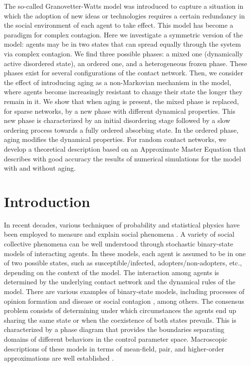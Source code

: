 
The so-called Granovetter-Watts model was introduced to capture a situation in which the adoption of new ideas or technologies requires a certain redundancy in the social environment of each agent to take effect. This model has become a paradigm for complex contagion. Here we investigate a symmetric version of the model: agents may be in two states that can spread equally through the system via complex contagion. We find three possible phases: a mixed one (dynamically active disordered state), an ordered one, and a heterogeneous frozen phase. These phases exist for several configurations of the contact network. Then, we consider the effect of introducing aging as a non-Markovian mechanism in the model, where agents become increasingly resistant to change their state the longer they remain in it.  We show that when aging is present, the mixed phase is replaced, for sparse networks, by a new phase with different dynamical properties. This new phase is characterized by an initial disordering stage followed by a slow ordering process towards a fully ordered absorbing state. In the ordered phase, aging modifies the dynamical properties. For random contact networks, we develop a theoretical description based on an Approximate Master Equation that describes with good accuracy the results of numerical simulations for the model with and without aging.
	
\section{\label{sec:Introduction} Introduction}
	
In recent decades, various techniques of probability and statistical physics have been employed to measure and explain social phenomena \cite{castellano2009statistical,jusup2022social,bianconi2023complex}. A variety of social collective phenomena can be well understood through stochastic binary-state models of interacting agents. In these models, each agent is assumed to be in one of two possible states, such as susceptible/infected, adopters/non-adopters, etc., depending on the context of the model. The interaction among agents is determined by the underlying contact network and the dynamical rules of the model. There are various examples of binary-state models, including processes of opinion formation \cite{Voter-original, sood-2005, Suchecki-2005, fernandez-gracia-2014, redner-2019} and disease or social contagion \cite{granovetter-1978, pastor-satorras-2015}, among others. The consensus problem consists of determining under which circumstances the agents end up sharing the same state or when the coexistence of both states prevails. This is characterized by a phase diagram that provides the boundaries separating domains of different behaviors in the control parameter space. Macroscopic descriptions of these models in terms of mean-field, pair, and higher-order approximations are well established \cite{gleeson-2011}. 
	
